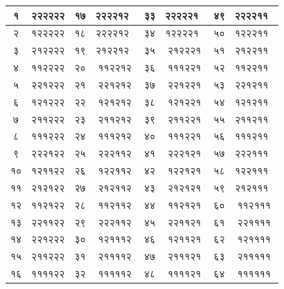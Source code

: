 \documentclass[11pt, openany]{book}
\begin{document}
\begin{table}[h]
\setlength{\extrarowheight}{6pt} \setlength{\tabcolsep}{8pt}
	\centering
\begin{tabular}{|c|c|c|c|c|c|c|c|}
	\hline
{\hbox{१}} & {\hbox{२२२२२२}} & {\hbox{१७}} & {\hbox{२२२२१२ }}&  {\hbox{३३}}   & {\hbox{२२२२२१ }} & {\hbox{४९}} &  {\hbox{२२२२११ }}\\
\hline
{\hbox{२}} & {\hbox{१२२२२२}} & {\hbox{१८}} & {\hbox{२२२२१२ }}&  {\hbox{३४}}   & {\hbox{१२२२२१ }} & {\hbox{५०}} &  {\hbox{१२२२११ }}\\
\hline
{\hbox{३}} & {\hbox{२१२२२२}} & {\hbox{१९}} & {\hbox{२१२२१२ }}& {\hbox{३५}}   & {\hbox{२१२२२१}} & {\hbox{५१}} &  {\hbox{२१२२११ }}\\
\hline
{\hbox{४}} & {\hbox{११२२२२}} & {\hbox{२०}} & {\hbox{११२२१२}}& {\hbox{३६}}   & {\hbox{१११२२१}} & {\hbox{५२}} &  {\hbox{११२२११ }}\\
\hline
{\hbox{५}} & {\hbox{२२१२२२}} & {\hbox{२१}} & {\hbox{२२१२१२}}& {\hbox{३७}}   & {\hbox{२२१२२१}} & {\hbox{५३}} &  {\hbox{२२१२११ }}\\
\hline 
{\hbox{६}} & {\hbox{१२१२२२}} & {\hbox{२२}} & {\hbox{१२१२१२}}& {\hbox{३८}}   & {\hbox{१२१२२१}} & {\hbox{५४}} &  {\hbox{१२१२११ }}\\
\hline 
{\hbox{७}} & {\hbox{२११२२२}} & {\hbox{२३}} & {\hbox{२११२१२}}& {\hbox{३९}}   & {\hbox{२११२२१}} & {\hbox{५५}} &  {\hbox{२११२११ }}\\
\hline 
{\hbox{८}} & {\hbox{१११२२२}} & {\hbox{२४}} & {\hbox{१११२१२}}& {\hbox{४०}}   & {\hbox{१११२२१}} & {\hbox{५६}} &  {\hbox{१११२११ }}\\
\hline 
{\hbox{९}} & {\hbox{२२२१२२}} & {\hbox{२५}} & {\hbox{२२२११२}}& {\hbox{४१}}   & {\hbox{२२२१२१}} & {\hbox{५७}} &  {\hbox{२२२१११ }}\\
\hline 
{\hbox{१०}} & {\hbox{१२११२२}} & {\hbox{२६}} & {\hbox{१२२११२}}& {\hbox{४२}}   & {\hbox{१२२१२१}} & {\hbox{५८}} &  {\hbox{१२२१११ }}\\
\hline 
{\hbox{११}} & {\hbox{२१२१२२}} & {\hbox{२७}} & {\hbox{२१२११२}}& {\hbox{४३}}   & {\hbox{२१२१२१}} & {\hbox{५९}} &  {\hbox{२१२१११ }}\\
\hline 
{\hbox{१२}} & {\hbox{११२१२२}} & {\hbox{२८}} & {\hbox{११२११२}}& {\hbox{४४}}   & {\hbox{११२१२१}} & {\hbox{६०}} &  {\hbox{११२१११}}\\
\hline
{\hbox{१३}} & {\hbox{२२११२२}} & {\hbox{२९}} & {\hbox{२२२११२}}& {\hbox{४५}}   & {\hbox{२२११२१}} & {\hbox{६१}} &  {\hbox{२२११११}}\\
\hline 
{\hbox{१४}} & {\hbox{२२१२२२}} & {\hbox{३०}} & {\hbox{१२१११२}}& {\hbox{४६}}   & {\hbox{१२११२१}} & {\hbox{६२}} &  {\hbox{१२११११}}\\
\hline 
{\hbox{१५}} & {\hbox{२११२२२}} & {\hbox{३१}} & {\hbox{२११११२}}& {\hbox{४७}}   & {\hbox{२१११२१}} & {\hbox{६३}} &  {\hbox{२१११११}}\\
	\hline 
{\hbox{१६}} & {\hbox{११११२२}} & {\hbox{३२}} & {\hbox{१११११२}}& {\hbox{४८}}   & {\hbox{११११२१}} & {\hbox{६४}} &  {\hbox{११११११}}\\
	\hline 	
\end{tabular}
\end{table}
\end{document}
